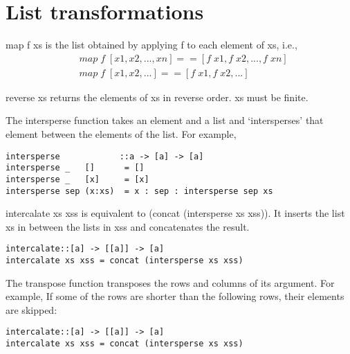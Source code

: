 \section{List transformations}

map f xs is the list obtained by applying f to each element of xs, i.e.,
\begin{align*}
	&map\; f\; [x1, x2, ..., xn] == [f\; x1, f\; x2, ..., f\; xn]\\
	&map\; f\; [x1, x2, ...] == [f\; x1, f\; x2, ...]
\end{align*}

reverse xs returns the elements of xs in reverse order. xs must be finite.

The intersperse function takes an element and a list and `intersperses' that element between the elements of the list. For example,

\begin{lstlisting}[frame=single]
intersperse            ::a -> [a] -> [a]
intersperse _   []      = []
intersperse _   [x]     = [x]
intersperse sep (x:xs)  = x : sep : intersperse sep xs
\end{lstlisting}

intercalate xs xss is equivalent to (concat (intersperse xs xss)). It inserts the list xs in between the lists in xss and concatenates the result.

\begin{lstlisting}[frame=single]
intercalate::[a] -> [[a]] -> [a]
intercalate xs xss = concat (intersperse xs xss)
\end{lstlisting}

The transpose function transposes the rows and columns of its argument. For example,
If some of the rows are shorter than the following rows, their elements are skipped:

\begin{lstlisting}[frame=single]
intercalate::[a] -> [[a]] -> [a]
intercalate xs xss = concat (intersperse xs xss)
\end{lstlisting}


